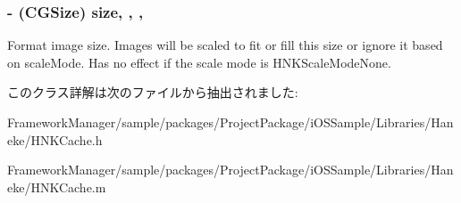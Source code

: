 \subsubsection[{size}]{\setlength{\rightskip}{0pt plus 5cm}-\/ (C\+G\+Size) size\hspace{0.3cm}{\ttfamily [read]}, {\ttfamily [write]}, {\ttfamily [nonatomic]}, {\ttfamily [assign]}}\label{interface_h_n_k_cache_format_a23bcc9d23bed21b1113f28ee296c59f9}
Format image size. Images will be scaled to fit or fill this size or ignore it based on scale\+Mode.  Has no effect if the scale mode is H\+N\+K\+Scale\+Mode\+None. 

このクラス詳解は次のファイルから抽出されました\+:\begin{DoxyCompactItemize}
\item 
Framework\+Manager/sample/packages/\+Project\+Package/i\+O\+S\+Sample/\+Libraries/\+Haneke/H\+N\+K\+Cache.\+h\item 
Framework\+Manager/sample/packages/\+Project\+Package/i\+O\+S\+Sample/\+Libraries/\+Haneke/H\+N\+K\+Cache.\+m\end{DoxyCompactItemize}
